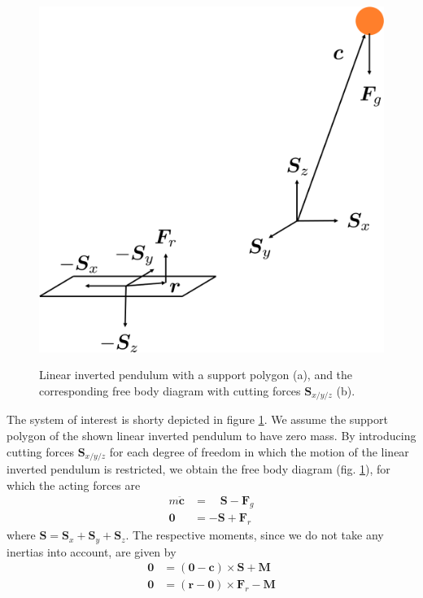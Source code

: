 \begin{figure}[h]
	[.4\linewidth]{\includegraphics[scale=.3]{chapters/03_background/img/inverted_pendulum_free_body_diagram.png}}
	\caption{Linear inverted pendulum with a support polygon (a), and the corresponding free body diagram with cutting forces $\bm{S}_{x/y/z}$ (b).}
	\label{fig::311_lip}
\end{figure}
The system of interest is shorty depicted in figure \ref{fig::311_lip}. We assume the support polygon of the shown linear inverted pendulum to have zero mass. By introducing cutting forces $\bm{S}_{x/y/z}$ for each degree of freedom in which the motion of the linear inverted pendulum is restricted, we obtain the free body diagram (fig. \ref{fig::311_lip}), for which the acting forces are
\begin{align}
	m\ddot{\bm{c}} &=\quad\bm{S} - \bm{F}_g 
	\label{eq::311_pendulum_force} \\
	\bm{0} &= -\bm{S}+\bm{F}_r
	\label{eq::311_support_polygon_force}
\end{align}
where $\bm{S}=\bm{S}_x+\bm{S}_y+\bm{S}_z$. The respective moments, since we do not take any inertias into account, are given by
\begin{align}
	\bm{0} &= (\bm{0}-\bm{c})\times\bm{S} + \bm{M} 
	\label{eq::311_pendulum_moment}\\	
	\bm{0} &= (\bm{r}-\bm{0})\times\bm{F}_r - \bm{M}
	\label{eq::311_support_polygon_moment}	
\end{align}
